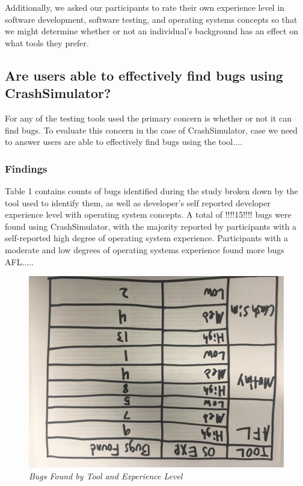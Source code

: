 Additionally, we asked our participants to rate their own experience level in
software development, software testing, and operating systems concepts so
that we might determine whether or not an individual's background has an
effect on what tools they prefer.

\subsection{Are users able to effectively find bugs using CrashSimulator?}

For any of the testing tools used the primary concern is whether or not it
can find bugs.  To evaluate this concern in the case of CrashSimulator,
case we need to answer users are able to
effectively find bugs using the tool....


\subsubsection{Findings}

Table 1 contains counts of bugs identified during the study
broken down by the tool used to
identify them, as well as developer's self reported developer experience
level with operating
system concepts. A total of !!!!15!!!! bugs were found using
CrashSimulator, with the majority reported by participants with a
self-reported high degree of operating system experience.  Participants
with a moderate and low degrees of operating systems experience found more
bugs AFL.....

\begin{figure}[t]
  \center{}
  \includegraphics[scale=.5]{images/table1}
  \caption{\emph{Bugs Found by Tool and Experience Level}}
  \label{fig-tool-exp}
\end{figure}


